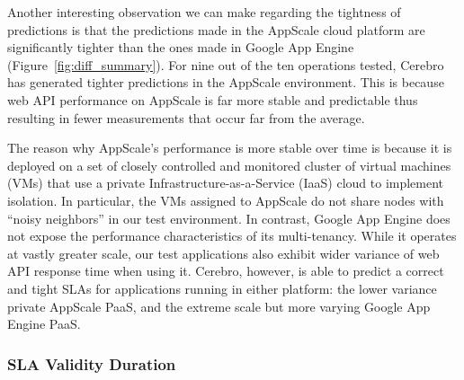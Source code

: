 Another interesting observation we can make regarding the tightness of
predictions is that the predictions made in the AppScale cloud platform are
significantly tighter than the ones made in Google App Engine
(Figure~\ref{fig:diff_summary}). 
For nine out of the ten operations tested, Cerebro has generated tighter
predictions in the AppScale environment. This is because web API performance
on AppScale is far more stable and predictable thus resulting in fewer
measurements that occur far from the average.

The reason why AppScale's performance is more stable over time is because it is
deployed on a set of closely controlled 
and monitored cluster of virtual machines (VMs) that use a private
Infrastructure-as-a-Service (IaaS) cloud to implement isolation.  In particular, the 
VMs assigned to AppScale do not share nodes with ``noisy neighbors'' in our
test environment.  In contrast, Google App Engine does not expose the
performance characteristics of its multi-tenancy.  While it operates at vastly
greater scale, our test applications also exhibit wider variance of web API
response time when using it.
Cerebro, however, is able to predict a correct and tight SLAs for applications
running in either platform: the lower variance private
AppScale PaaS, and the extreme scale but more varying Google App Engine PaaS.

\subsubsection{SLA Validity Duration}

